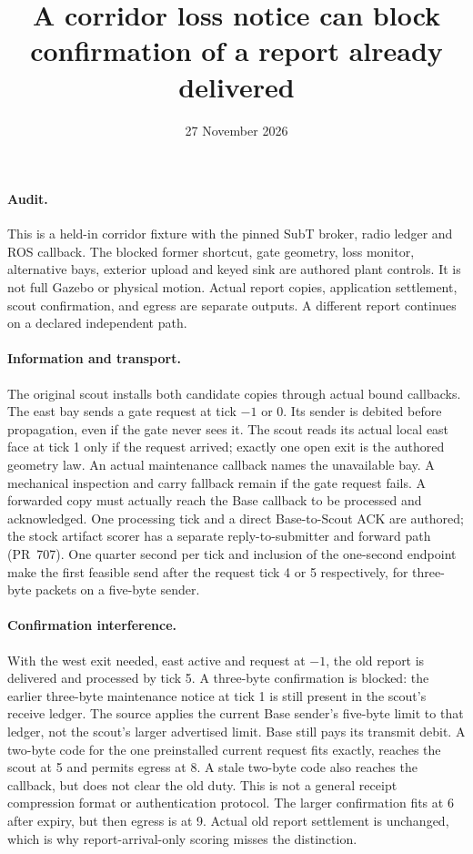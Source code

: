 \documentclass[11pt]{article}
\title{A corridor loss notice can block confirmation of a report already delivered}
\date{27 November 2026}
\begin{document}
\maketitle
\paragraph{Audit.}
This is a held-in corridor fixture with the pinned SubT broker,
radio ledger and ROS callback. The blocked former shortcut, gate
geometry, loss monitor, alternative bays, exterior upload and
keyed sink are authored plant controls. It is not full Gazebo
or physical motion. Actual report copies, application settlement,
scout confirmation, and egress are separate outputs. A different
report continues on a declared independent path.
\paragraph{Information and transport.}
The original scout installs both candidate copies through actual
bound callbacks. The east bay sends a gate request at tick $-1$
or 0. Its sender is debited before propagation, even if the
gate never sees it. The scout reads its actual local east face
at tick 1 only if the request arrived; exactly one open exit
is the authored geometry law. An actual maintenance callback
names the unavailable bay. A mechanical inspection and carry
fallback remain if the gate request fails. A forwarded copy
must actually reach the Base callback to be processed and
acknowledged. One processing tick and a direct Base-to-Scout
ACK are authored; the stock artifact scorer has a separate
reply-to-submitter and forward path (PR~707). One quarter
second per tick and inclusion of the one-second endpoint make
the first feasible send after the request tick 4 or 5
respectively, for three-byte packets on a five-byte sender.
\paragraph{Confirmation interference.}
With the west exit needed, east active and request at $-1$,
the old report is delivered and processed by tick 5.
A three-byte confirmation is blocked: the earlier three-byte
maintenance notice at tick 1 is still present in the scout's
receive ledger. The source applies the current Base sender's
five-byte limit to that ledger, not the scout's larger
advertised limit. Base still pays its transmit debit.
A two-byte code for the one preinstalled current request
fits exactly, reaches the scout at 5 and permits egress at 8.
A stale two-byte code also reaches the callback, but does
not clear the old duty. This is not a general receipt
compression format or authentication protocol. The larger
confirmation fits at 6 after expiry, but then egress is at 9.
Actual old report settlement is unchanged, which is why
report-arrival-only scoring misses the distinction.
\end{document}
